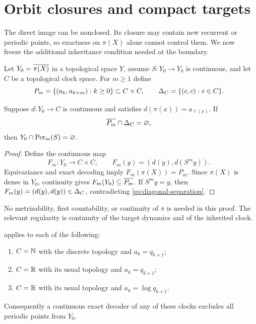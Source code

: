 \section{Orbit closures and compact targets}
\label{sec:closure}

The direct image can be nonclosed.  Its closure may contain new recurrent or
periodic points, so exactness on $\pi(X)$ alone cannot control them.  We now
freeze the additional inheritance condition needed at the boundary.

Let $Y_0=\overline{\pi(X)}$ in a topological space $Y$, assume $S:Y_0\to Y_0$ is
continuous, and let $C$ be a topological clock space.  For $m\ge1$ define
\begin{equation}
P_m=\{(a_k,a_{k+m}):k\ge0\}\subset C\times C,
\qquad
\Delta_C=\{(c,c):c\in C\}.
\label{eq:lag-pairs}
\end{equation}

\begin{theorem}
\label{thm:closure}
Suppose $d:Y_0\to C$ is continuous and satisfies
$d(\pi(x))=a_{\ell(x)}$.  If
\begin{equation}
\overline{P_m}\cap\Delta_C=\varnothing,
\label{eq:diagonal-separation}
\end{equation}
then $Y_0\cap\operatorname{Per}_m(S)=\varnothing$.
\end{theorem}

\begin{proof}
Define the continuous map
\[
F_m:Y_0\to C\times C,
\qquad
F_m(y)=(d(y),d(S^my)).
\]
Equivariance and exact decoding imply
$F_m(\pi(X))=P_m$.  Since $\pi(X)$ is dense in $Y_0$, continuity gives
$F_m(Y_0)\subseteq\overline{P_m}$.  If $S^my=y$, then
$F_m(y)=(d(y),d(y))\in\Delta_C$, contradicting
\eqref{eq:diagonal-separation}.
\end{proof}

No metrizability, first countability, or continuity of $\pi$ is needed in
this proof.  The relevant regularity is continuity of the target dynamics
and of the inherited clock.

\begin{corollary}
\label{cor:closure-wheel}
 applies to each of the following:
\begin{enumerate}[label=(\roman*)]
  \item $C=\mathbb{N}$ with the discrete topology and $a_k=q_{k+1}$;
  \item $C=\mathbb{R}$ with its usual topology and $a_k=q_{k+1}$;
  \item $C=\mathbb{R}$ with its usual topology and $a_k=\log q_{k+1}$.
\end{enumerate}
Consequently a continuous exact decoder of any of these clocks excludes all
periodic points from $Y_0$.
\end{corollary}

